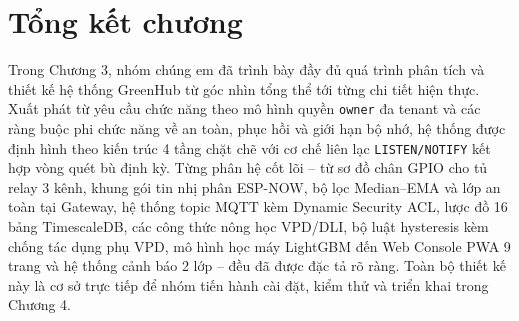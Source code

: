 

\section{Tổng kết chương}
\label{sec:c3-summary}

Trong Chương 3, nhóm chúng em đã trình bày đầy đủ quá trình phân tích và thiết kế hệ thống GreenHub từ góc nhìn tổng thể tới từng chi tiết hiện thực. Xuất phát từ yêu cầu chức năng theo mô hình quyền \texttt{owner} đa tenant và các ràng buộc phi chức năng về an toàn, phục hồi và giới hạn bộ nhớ, hệ thống được định hình theo kiến trúc 4 tầng chặt chẽ với cơ chế liên lạc \texttt{LISTEN/NOTIFY} kết hợp vòng quét bù định kỳ. Từng phân hệ cốt lõi -- từ sơ đồ chân GPIO cho tủ relay 3 kênh, khung gói tin nhị phân ESP-NOW, bộ lọc Median--EMA và lớp an toàn tại Gateway, hệ thống topic MQTT kèm Dynamic Security ACL, lược đồ 16 bảng TimescaleDB, các công thức nông học VPD/DLI, bộ luật hysteresis kèm chống tác dụng phụ VPD, mô hình học máy LightGBM đến Web Console PWA 9 trang và hệ thống cảnh báo 2 lớp -- đều đã được đặc tả rõ ràng. Toàn bộ thiết kế này là cơ sở trực tiếp để nhóm tiến hành cài đặt, kiểm thử và triển khai trong Chương 4.
